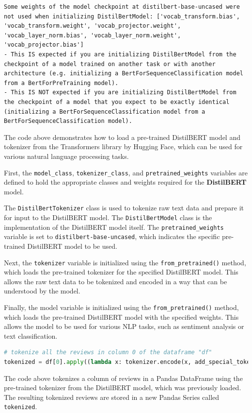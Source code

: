 \begin{lstlisting}
Some weights of the model checkpoint at distilbert-base-uncased were not used when initializing DistilBertModel: ['vocab_transform.bias', 'vocab_transform.weight', 'vocab_projector.weight', 'vocab_layer_norm.bias', 'vocab_layer_norm.weight', 'vocab_projector.bias']
- This IS expected if you are initializing DistilBertModel from the checkpoint of a model trained on another task or with another architecture (e.g. initializing a BertForSequenceClassification model from a BertForPreTraining model).
- This IS NOT expected if you are initializing DistilBertModel from the checkpoint of a model that you expect to be exactly identical (initializing a BertForSequenceClassification model from a BertForSequenceClassification model).
\end{lstlisting}

The code above demonstrates how to load a pre-trained DistilBERT model
and tokenizer from the Transformers library by Hugging Face, which can
be used for various natural language processing tasks. \newline

First, the \lstinline{model_class},
\lstinline{tokenizer_class}, and
\lstinline{pretrained_weights} variables are defined to
hold the appropriate classes and weights required for the
\textbf{DistilBERT} model. \newline

The \lstinline{DistilBertTokenizer} class is used to
tokenize raw text data and prepare it for input to the DistilBERT model.
The \lstinline{DistilBertModel} class is the
implementation of the DistilBERT model itself. The
\lstinline{pretrained_weights} variable is set to
\lstinline{distilbert-base-uncased}, which indicates the
specific pre-trained DistilBERT model to be used. \newline

Next, the \lstinline{tokenizer} variable is initialized
using the \lstinline{from_pretrained()} method, which
loads the pre-trained tokenizer for the specified DistilBERT model. This
allows the raw text data to be tokenized and encoded in a way that can
be understood by the model. \newline

Finally, the model variable is initialized using the
\lstinline{from_pretrained()} method, which loads the
pre-trained DistilBERT model with the specified weights. This allows the
model to be used for various NLP tasks, such as sentiment analysis or
text classification. \newline
\begin{lstlisting}[language=Python]
# tokenize all the reviews in column 0 of the dataframe "df"
tokenized = df[0].apply((lambda x: tokenizer.encode(x, add_special_tokens=True)))
\end{lstlisting}
The code above tokenizes a column of reviews in a Pandas DataFrame using
the pre-trained tokenizer from the DistilBERT model, which was
previously loaded. The resulting tokenized reviews are stored in a new
Pandas Series called \lstinline{tokenized}. \newline

